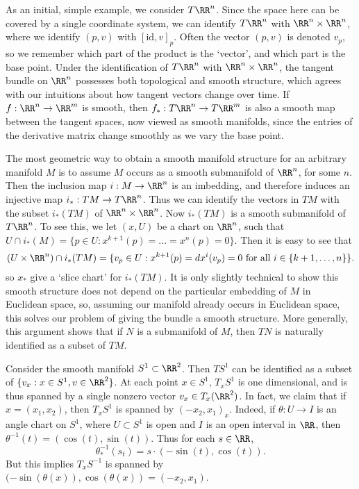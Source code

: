As an initial, simple example, we consider $T\RR^n$. Since the space here can be covered by a single coordinate system, we can identify $T\RR^n$ with $\RR^n \times \RR^n$, where we identify $(p,v)$ with $[\text{id}, v]_p$. Often the vector $(p,v)$ is denoted $v_p$, so we remember which part of the product is the `vector', and which part is the base point. Under the identification of $T\RR^n$ with $\RR^n \times \RR^n$, the tangent bundle on $\RR^n$ possesses both topological and smooth structure, which agrees with our intuitions about how tangent vectors change over time. If $f: \RR^n \to \RR^m$ is smooth, then $f_*: T\RR^n \to T\RR^m$ is also a smooth map between the tangent spaces, now viewed as smooth manifolds, since the entries of the derivative matrix change smoothly as we vary the base point.

The most geometric way to obtain a smooth manifold structure for an arbitrary manifold $M$ is to assume $M$ occurs as a smooth submanifold of $\RR^n$, for some $n$. Then the inclusion map $i: M \to \RR^n$ is an imbedding, and therefore induces an injective map $i_*: TM \to T\RR^n$. Thus we can identify the vectors in $TM$ with the subset $i_*(TM)$ of $\RR^n \times \RR^n$. Now $i_*(TM)$ is a smooth submanifold of $T\RR^n$. To see this, we let $(x,U)$ be a chart on $\RR^n$, such that $U \cap i_*(M) = \{ p \in U: x^{k+1}(p) = \dots = x^n(p) = 0 \}$. Then it is easy to see that
%
\[ (U \times \RR^n) \cap i_*(TM) = \{ v_p \in U: x^{k+1}(p) = dx^i(v_p) = 0\ \text{for all}\ i \in \{ k+1, \dots, n \} \}. \]
%
so $x_*$ give a `slice chart' for $i_*(TM)$. It is only slightly technical to show this smooth structure does not depend on the particular embedding of $M$ in Euclidean space, so, assuming our manifold already occurs in Euclidean space, this solves our problem of giving the bundle a smooth structure. More generally, this argument shows that if $N$ is a submanifold of $M$, then $TN$ is naturally identified as a subset of $TM$.

\begin{example}
    Consider the smooth manifold $S^1 \subset \RR^2$. Then $TS^1$ can be identified as a subset of $\{ v_x: x \in S^1, v \in \RR^2 \}$. At each point $x \in S^1$, $T_xS^1$ is one dimensional, and is thus spanned by a single nonzero vector $v_x \in T_x(\RR^2)$. In fact, we claim that if $x = (x_1,x_2)$, then $T_xS^1$ is spanned by $(-x_2,x_1)_x$. Indeed, if $\theta: U \to I$ is an angle chart on $S^1$, where $U \subset S^1$ is open and $I$ is an open interval in $\RR$, then $\theta^{-1}(t) = (\cos(t), \sin(t))$. Thus for each $s \in \RR$,
    \[ \theta^{-1}_*(s_t) = s \cdot (-\sin(t), \cos(t)). \]
    But this implies $T_x S^{-1}$ is spanned by $(-\sin(\theta(x)), \cos(\theta(x)) = (-x_2,x_1)$.
\end{example}

